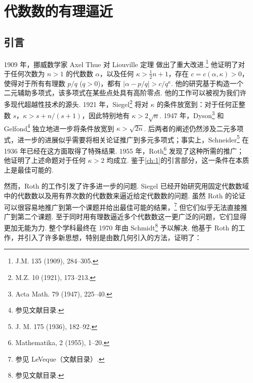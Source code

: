 
\chapter{代数数的有理逼近}\label{ch:7}

\section{引言}\label{sec:ch7_1}

1909 年，挪威数学家 Axel Thue 对 Liouville 定理 做出了重大改进.\footnote{J.M. 135 (1909), 284--305.} 他证明了对于任何次数为 $n > 1$ 的代数数 $\alpha$，以及任何 $\kappa > \frac{1}{2}n + 1$，存在 $c = c(\alpha, \kappa) > 0$，使得对于所有有理数 $p/q$ ($q>0$)，都有 $|\alpha - p/q| > c/q^{\kappa}$. 他的研究基于构造一个二元辅助多项式，该多项式在某些点处具有高阶零点. 他的工作可以被视为我们许多现代超越性技术的源头. 1921 年，Siegel\footnote{M.Z. 10 (1921), 173--213.} 将对 $\kappa$ 的条件放宽到：对于任何正整数 $s$，$\kappa > s + n/(s+1)$，因此特别地有 $\kappa > 2\sqrt{n}$. 1947 年，Dyson\footnote{Acta Math. 79 (1947), 225--40.} 和 Gelfond\footnote{参见文献目录.} 独立地进一步将条件放宽到 $\kappa > \sqrt{2n}$. 后两者的阐述仍然涉及二元多项式，进一步的进展似乎需要将相关论证推广到多元多项式；事实上，Schneider\footnote{J. M. 175 (1936), 182--92.} 在 1936 年已经在这方面取得了特殊结果. 1955 年，Roth\footnote{Mathematika, 2 (1955), 1--20.} 发现了这种所需的推广；他证明了上述命题对于任何 $\kappa > 2$ 均成立. 鉴于\autoref{ch:1}的引言部分，这一条件在本质上是最佳可能的.

然而，Roth 的工作引发了许多进一步的问题. Siegel 已经开始研究用固定代数数域中的代数数以及用有界次数的代数数来逼近给定代数数的问题. 虽然 Roth 的论证可以很容易地推广到第一个课题并给出最佳可能的结果，\footnote{参见 LeVeque（文献目录）.} 但它们似乎无法直接推广到第二个课题. 至于同时用有理数逼近多个代数数这一更广泛的问题，它们显得更加无能为力. 整个学科最终在 1970 年由 Schmidt\footnote{参见文献目录.} 予以解决. 他基于 Roth 的工作，并引入了许多新思想，特别是由数几何引入的方法，证明了：

